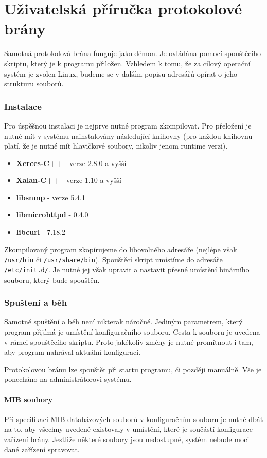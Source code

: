 \chapter{Uživatelská příručka protokolové brány}
\label{kap_uzivatelska_prirucka_brana}
Samotná protokolová brána funguje jako démon. Je ovládána pomocí spouštěcího skriptu, který je k
programu přiložen. Vzhledem k tomu, že za cílový operační systém je zvolen Linux, budeme se v dalším 
popisu adresářů opírat o jeho strukturu souborů.

\subsection*{Instalace}
Pro úspěšnou instalaci je nejprve nutné program zkompilovat. Pro přeložení je nutné mít v systému nainstalovány následující knihovny
(pro každou knihovnu platí, že je nutné mít hlavičkové soubory, nikoliv jenom runtime verzi).
\begin{itemize}
	\item \textbf{Xerces-C++} - verze 2.8.0 a vyšší
	\item \textbf{Xalan-C++} - verze 1.10 a vyšší
	\item \textbf{libsnmp} - verze 5.4.1
	\item \textbf{libmicrohttpd} - 0.4.0
	\item \textbf{libcurl} - 7.18.2
\end{itemize}

Zkompilovaný program zkopírujeme do libovolného adresáře (nejlépe však \verb|/usr/bin| či \verb|/usr/share/bin|). 
Spouštěcí skript umístíme do adresáře \verb|/etc/init.d/|. Je nutné jej však upravit a nastavit přesné umístění
binárního souboru, který bude spouštěn.

\subsection*{Spuštení a běh}
Samotné spuštění a běh není nikterak náročné. Jediným parametrem, který program přijímá je umístění konfiguračního souboru.
Cesta k souboru je uvedena v rámci spouštěcího skriptu. Proto jakékoliv změny je nutné promítnout i tam, aby program nahrával
aktuální konfiguraci.

Protokolovou bránu lze spouštět při startu programu, či později manuálně. Vše je ponecháno na administrátorovi systému.

\subsubsection*{MIB soubory}
Při specifikaci MIB databázových souborů v konfiguračním souboru je nutné dbát na to, aby všechny uvedené existovaly
v umístění, které je součástí konfigurace zařízení brány. Jestliže některé soubory jsou nedostupné, systém nebude moci
dané zařízení spravovat.



